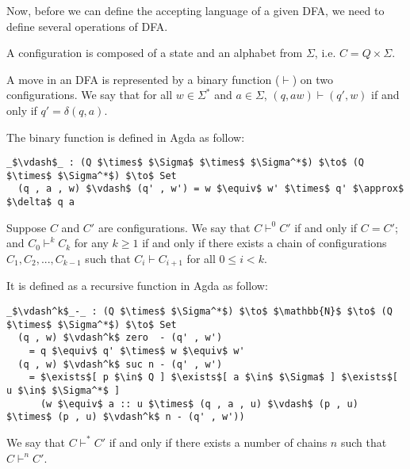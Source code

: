 \par Now, before we can define the accepting language of a given
DFA, we need to define several operations of DFA. 

\begin{defn}
\noindent A configuration is composed of a state and an alphabet from
\(\Sigma\), i.e. \(C = Q \times \Sigma\). 
\end{defn}

\begin{defn}
\noindent A move in an DFA is
represented by a binary function (\(\vdash\)) on two configurations. We say
that for all \(w \in \Sigma^*\) and \(a \in \Sigma\), \((q, aw)
\vdash (q' , w)\) if and only if \(q' = \delta (q , a)\). 
\end{defn}

\par The binary function is defined in Agda as follow: 
\begin{lstlisting}[mathescape=true,xleftmargin=.3\textwidth]
  _$\vdash$_ : (Q $\times$ $\Sigma$ $\times$ $\Sigma^*$) $\to$ (Q $\times$ $\Sigma^*$) $\to$ Set
  (q , a , w) $\vdash$ (q' , w') = w $\equiv$ w' $\times$ q' $\approx$ $\delta$ q a
\end{lstlisting}

\begin{defn}
\noindent Suppose \(C\) and \(C'\) are configurations. We say that \(C \vdash^0 C'\) if and only
if \(C = C'\); and \(C_0 \vdash^k C_k\) for any \(k \geq 1\) if and only if there exists a chain of
configurations \(C_1, C_2, ..., C_{k-1}\) such that \(C_i \vdash C_{i+1}\) for all \(0 \leq i < k\). 
\end{defn}

\par It is defined as a recursive function in Agda as follow: 
\begin{lstlisting}[mathescape=true,xleftmargin=.3\textwidth]
  _$\vdash^k$_-_ : (Q $\times$ $\Sigma^*$) $\to$ $\mathbb{N}$ $\to$ (Q $\times$ $\Sigma^*$) $\to$ Set
  (q , w) $\vdash^k$ zero  - (q' , w')
    = q $\equiv$ q' $\times$ w $\equiv$ w'
  (q , w) $\vdash^k$ suc n - (q' , w') 
    = $\exists$[ p $\in$ Q ] $\exists$[ a $\in$ $\Sigma$ ] $\exists$[ u $\in$ $\Sigma^*$ ]
      (w $\equiv$ a :: u $\times$ (q , a , u) $\vdash$ (p , u) $\times$ (p , u) $\vdash^k$ n - (q' , w'))
\end{lstlisting}

\begin{defn}
\noindent We say that \(C \vdash^* C'\) if and only
if there exists a number of chains \(n\) such that \(C \vdash^n C'\). 
\end{defn}

